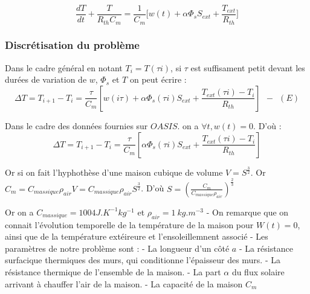 \documentclass[11pt]{article}
\begin{document}
\[\boxed{\frac{dT}{dt} + \frac{T}{R_{th}C_{m}} =\frac{1}{C_{m}}\Bigg[w(t) +\alpha \Phi_sS_{ext} +\frac{T_{ext}}{R_{th}}  \Bigg]}\]

\hypertarget{discruxe9tisation-du-probluxe8me}{%
\subsubsection{Discrétisation du
problème}\label{discruxe9tisation-du-probluxe8me}}

Dans le cadre général en notant \(T_i = T(\tau i)\), si \(\tau\) est
suffisament petit devant les durées de variation de \(w\), \(\Phi_s\) et
\(T\) on peut écrire :
\[\boxed{\Delta T= T_{i+1}-T_{i}=\frac{\tau}{C_{m}}[w(i\tau) +\alpha \Phi_s(\tau i )S_{ext} + \frac{T_{ext}(\tau i )-T_i}{R_{th}}]} \ \ - \ \ (E)\]

Dans le cadre des données fournies sur \(OASIS\). on a
\(\forall t, w(t) = 0\). D'où :
\[\Delta T= T_{i+1}-T_{i}=\frac{\tau}{C_{m}}[\alpha \Phi_s(\tau i )S_{ext} + \frac{T_{ext}(\tau i )-T_i}{R_{th}}]\]

Or si on fait l'hyphothèse d'une maison cubique de volume
\(V = S^{\frac{3}{2}}\). Or
\(C_m = C_{massique}\rho_{air}V = C_{massique}\rho_{air}S^{\frac{3}{2}}\).
D'où \(S = (\frac{C_m}{C_{massique}\rho_{air}})^{\frac{2}{3}}\)

Or on a \(C_{massique} = 1004 J.K^{-1}kg^{-1}\) et
\(\rho_{air} = 1 \ kg.m^{-3}\) - On remarque que on connait l'évolution
temporelle de la température de la maison pour \(W(t)=0\), ainsi que de
la température extéireure et l'ensoleillemnent associé - Les paramètres
de notre problème sont : - La longueur d'un côté \(a\) - La résistance
surfacique thermiques des murs, qui conditionne l'épaisseur des murs. -
La résistance thermique de l'ensemble de la maison. - La part \(\alpha\)
du flux solaire arrivant à chauffer l'air de la maison. - La capacité de
la maison \(C_m\)
\end{document}
